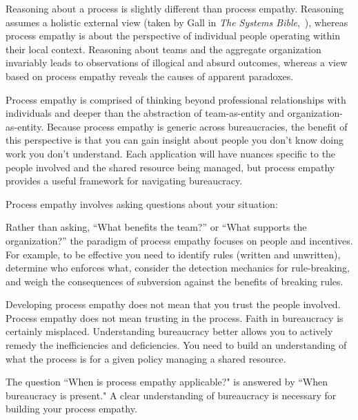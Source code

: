 Reasoning about a process is slightly different than process empathy. Reasoning assumes a holistic external view (taken by Gall in \textit{The Systems Bible},~\cite{2002_Gall}), whereas process empathy is about the perspective of individual people operating within their local context. Reasoning about teams and the aggregate organization invariably leads to observations of illogical and absurd outcomes, whereas a view based on process empathy reveals the causes of apparent paradoxes.

Process empathy is comprised of thinking beyond professional relationships with individuals and deeper than the abstraction of team-as-entity and organization-as-entity. 
Because process empathy is generic across bureaucracies, the benefit of this perspective is that you can gain insight about people you don't know doing work you don't understand.
Each application will have nuances specific to the people involved and the shared resource being managed, but process empathy provides a useful framework for navigating bureaucracy.


Process empathy involves asking questions about your situation:

Rather than asking, ``What benefits the team?'' or ``What supports the organization?'' the paradigm of process empathy focuses on people and incentives. %
For example, to be effective you need to 
identify rules (written and unwritten), determine who enforces what, consider the detection mechanics for rule-breaking, and weigh the consequences of subversion against the benefits of breaking rules.

Developing process empathy does not mean that you trust the people involved. Process empathy does not mean trusting in the process. Faith in bureaucracy is certainly misplaced. Understanding bureaucracy better allows you to actively remedy the inefficiencies and deficiencies. 
You need to build an understanding of what the process is for a given policy managing a \gls{shared resource}. 

The question ``When is process empathy applicable?" is answered by ``When bureaucracy is present." A clear understanding of bureaucracy is necessary for building your process empathy.

